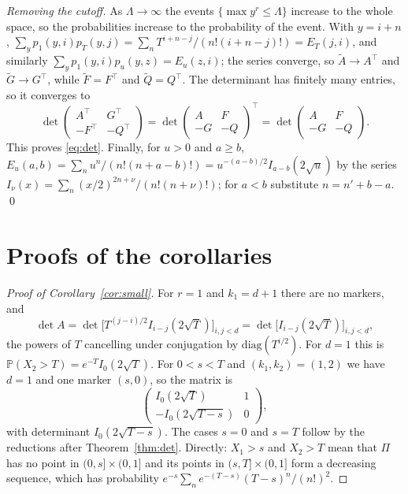 \documentclass[11pt]{amsart}
\theoremstyle{remark}
\numberwithin{equation}{section}
\newcommand{\Pp}{\mathbb P}
\begin{document}
\emph{Removing the cutoff.} As $\Lambda\to\infty$ the events $\{\max y^r\le\Lambda\}$ increase to the whole space, so the probabilities increase to the probability of the event. With $y=i+n$, $\sum_yp_1(y,i)p_T(y,j)=\sum_{n}T^{i+n-j}/(n!(i+n-j)!)=E_T(j,i)$, and similarly $\sum_yp_1(y,i)p_{u}(y,z)=E_u(z,i)$; the series converge, so $\tilde A\to A^{\top}$ and $\tilde G\to G^{\top}$, while $\tilde F=F^{\top}$ and $\tilde Q=Q^{\top}$. The determinant has finitely many entries, so it converges to
\[
\det\begin{pmatrix}A^{\top}&G^{\top}\\-F^{\top}&-Q^{\top}\end{pmatrix}=\det\begin{pmatrix}A&F\\-G&-Q\end{pmatrix}^{\top}=\det\begin{pmatrix}A&F\\-G&-Q\end{pmatrix}.
\]
This proves \eqref{eq:det}. Finally, for $u>0$ and $a\ge b$, $E_u(a,b)=\sum_nu^n/(n!(n+a-b)!)=u^{-(a-b)/2}I_{a-b}(2\sqrt u)$ by the series $I_\nu(x)=\sum_n(x/2)^{2n+\nu}/(n!(n+\nu)!)$; for $a<b$ substitute $n=n'+b-a$. \qed

\section{Proofs of the corollaries}\label{sec:cor}

\begin{proof}[Proof of Corollary~\ref{cor:small}]
For $r=1$ and $k_1=d+1$ there are no markers, and
\[
\det A=\det\bigl[T^{(j-i)/2}I_{i-j}(2\sqrt T)\bigr]_{i,j<d}=\det\bigl[I_{i-j}(2\sqrt T)\bigr]_{i,j<d},
\]
the powers of $T$ cancelling under conjugation by $\mathrm{diag}(T^{i/2})$. For $d=1$ this is $\Pp(X_2>T)=e^{-T}I_0(2\sqrt T)$. For $0<s<T$ and $(k_1,k_2)=(1,2)$ we have $d=1$ and one marker $(s,0)$, so the matrix is
\[
\begin{pmatrix}I_0(2\sqrt T)&1\\-I_0(2\sqrt{T-s})&0\end{pmatrix},
\]
with determinant $I_0(2\sqrt{T-s})$. The cases $s=0$ and $s=T$ follow by the reductions after Theorem~\ref{thm:det}. Directly: $X_1>s$ and $X_2>T$ mean that $\Pi$ has no point in $(0,s]\times(0,1]$ and its points in $(s,T]\times(0,1]$ form a decreasing sequence, which has probability $e^{-s}\sum_n e^{-(T-s)}(T-s)^n/(n!)^2$.
\end{proof}
\end{document}
